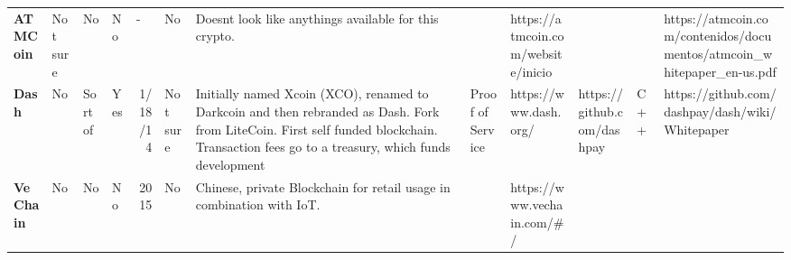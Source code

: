 \begin{table}[ht]
\begin{adjustbox}{width=25cm, height=6cm, angle=270}
\begin{tabular}{llllrlp{17.915em}rlrrr}
      \rowcolor[rgb]{ .267,  .447,  .769} \textcolor[rgb]{ 1,  1,  1}{\textbf{ATMCoin}} & \cellcolor[rgb]{ 1,  .922,  .612}\textcolor[rgb]{ .612,  .341,  0}{Not sure} & \cellcolor[rgb]{ 1,  .78,  .808}\textcolor[rgb]{ .612,  0,  .024}{No} & \cellcolor[rgb]{ 1,  .78,  .808}\textcolor[rgb]{ .612,  0,  .024}{No} & \multicolumn{1}{l}{\cellcolor[rgb]{ 1,  1,  1}-} & \cellcolor[rgb]{ 1,  .78,  .808}\textcolor[rgb]{ .612,  0,  .024}{No} & \cellcolor[rgb]{ 1,  1,  1}\textcolor[rgb]{ .188,  .329,  .588}{Doesnt look like anythings available for this crypto.} & \cellcolor[rgb]{ 1,  1,  1} & \cellcolor[rgb]{ 1,  1,  1}https://atmcoin.com/website/inicio & \cellcolor[rgb]{ 1,  1,  1} & \cellcolor[rgb]{ 1,  1,  1} & \multicolumn{1}{l}{\cellcolor[rgb]{ 1,  1,  1}https://atmcoin.com/contenidos/documentos/atmcoin\_whitepaper\_en-us.pdf} \\
      \rowcolor[rgb]{ .267,  .447,  .769} \textcolor[rgb]{ 1,  1,  1}{\textbf{Dash}} & \cellcolor[rgb]{ 1,  .78,  .808}\textcolor[rgb]{ .612,  0,  .024}{No} & \cellcolor[rgb]{ 1,  .922,  .612}\textcolor[rgb]{ .612,  .341,  0}{Sort of} & \cellcolor[rgb]{ .776,  .937,  .808}\textcolor[rgb]{ 0,  .38,  0}{Yes} & \cellcolor[rgb]{ .851,  .882,  .949}\textcolor[rgb]{ .188,  .329,  .588}{1/18/14} & \cellcolor[rgb]{ 1,  .922,  .612}\textcolor[rgb]{ .612,  .341,  0}{Not sure} & \cellcolor[rgb]{ .851,  .882,  .949}\textcolor[rgb]{ .188,  .329,  .588}{Initially named Xcoin (XCO), renamed to Darkcoin and then rebranded as Dash. Fork from LiteCoin. First self funded blockchain. Transaction fees go to a treasury, which funds development} & \multicolumn{1}{l}{\cellcolor[rgb]{ .851,  .882,  .949}\textcolor[rgb]{ .188,  .329,  .588}{Proof of Service}} & \cellcolor[rgb]{ .851,  .882,  .949}\textcolor[rgb]{ .188,  .329,  .588}{https://www.dash.org/} & \multicolumn{1}{l}{\cellcolor[rgb]{ .851,  .882,  .949}\textcolor[rgb]{ .188,  .329,  .588}{https://github.com/dashpay}} & \multicolumn{1}{l}{\cellcolor[rgb]{ .851,  .882,  .949}\textcolor[rgb]{ .188,  .329,  .588}{C++}} & \multicolumn{1}{l}{\cellcolor[rgb]{ .851,  .882,  .949}\textcolor[rgb]{ .188,  .329,  .588}{https://github.com/dashpay/dash/wiki/Whitepaper}} \\
      \rowcolor[rgb]{ .267,  .447,  .769} \textcolor[rgb]{ 1,  1,  1}{\textbf{VeChain}} & \cellcolor[rgb]{ 1,  .78,  .808}\textcolor[rgb]{ .612,  0,  .024}{No} & \cellcolor[rgb]{ 1,  .78,  .808}\textcolor[rgb]{ .612,  0,  .024}{No} & \cellcolor[rgb]{ 1,  .78,  .808}\textcolor[rgb]{ .612,  0,  .024}{No} & \cellcolor[rgb]{ 1,  1,  1}\textcolor[rgb]{ .188,  .329,  .588}{2015} & \cellcolor[rgb]{ 1,  .78,  .808}\textcolor[rgb]{ .612,  0,  .024}{No} & \cellcolor[rgb]{ 1,  1,  1}\textcolor[rgb]{ .188,  .329,  .588}{Chinese, private Blockchain for retail usage in combination with IoT.} & \cellcolor[rgb]{ 1,  1,  1}\textcolor[rgb]{ .188,  .329,  .588}{} & \cellcolor[rgb]{ 1,  1,  1}\textcolor[rgb]{ .188,  .329,  .588}{https://www.vechain.com/\#/} & \cellcolor[rgb]{ 1,  1,  1}\textcolor[rgb]{ .188,  .329,  .588}{} & \cellcolor[rgb]{ 1,  1,  1}\textcolor[rgb]{ .188,  .329,  .588}{} & \cellcolor[rgb]{ 1,  1,  1}\textcolor[rgb]{ .188,  .329,  .588}{} \\

\end{tabular}
\end{adjustbox}
\end{table}

